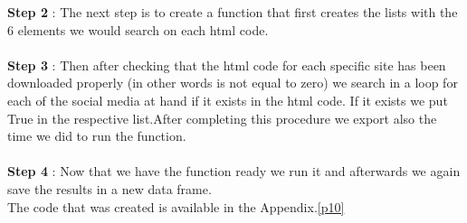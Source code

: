 \documentclass{article}
\begin{document}
\textbf{Step 2} : The next step is to create a function that first creates the lists with the 6 elements we would search on each html code. \\\\
\textbf{Step 3} : Then after checking that the html code for each specific site has been downloaded properly (in other words is not equal to zero) we search in a loop for each of the social media at hand if it exists in the html code. If it exists we put True in the respective list.After completing this procedure we export also the time we did to run the function.\\\\
\textbf{Step 4} : Now that we have the function ready we run it and afterwards we again save the results in a new data frame.\\
The code that was created is available in the Appendix.\ref{p10}
\end{document}
